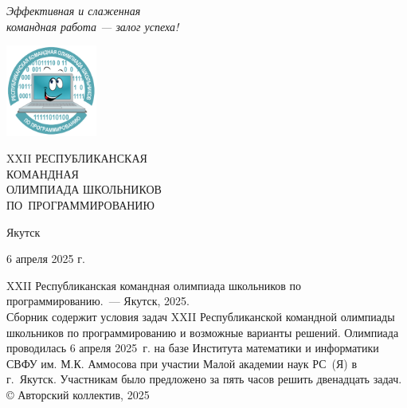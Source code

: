 \documentclass[a5paper, twoside, 11pt]{article}
\begin{document}
\pagestyle{empty}

\begin{flushright} \it
  Эффективная и слаженная \\
  командная работа --- залог успеха!
\end{flushright}
\vskip -15mm
\includegraphics[width=3cm,height=3cm]{figures/logo.pdf}
\\[3cm]
\begin{center}
\huge
XXII РЕСПУБЛИКАНСКАЯ\\КОМАНДНАЯ\\ОЛИМПИАДА ШКОЛЬНИКОВ\\
ПО~ПРОГРАММИРОВАНИЮ
\end{center}
\vfill
\centerline{Якутск}
\centerline{6 апреля 2025 г.}

\newpage
\noindent XXII Республиканская командная олимпиада школьников по программированию.~--- Якутск, 2025.
\\[5mm]
Сборник содержит условия задач XXII Республиканской командной олимпиады школьников по программированию и возможные варианты решений. Олимпиада проводилась 6 апреля 2025~г. на базе Института математики и информатики СВФУ им. М.К. Аммосова при участии Малой академии наук РС~(Я) в г.~Якутск. Участникам было предложено за пять часов решить двенадцать задач.
\vfill
\hfill © Авторский коллектив, 2025










\end{document}
